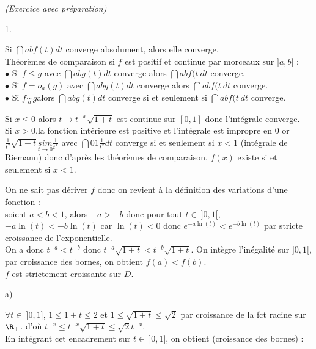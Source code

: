 \documentclass[11pt]{article}%
\begin{document}
 \begin{exercice}{\it (Exercice avec préparation)}~
 \begin{noliste}{1.}
 \setlength{\itemsep}{4mm}
 \item Si $\dint{a}{b} f(t)dt$ converge absolument, alors elle
converge.\\
 Théorèmes de comparaison si $f$ est positif et continue par morceaux
sur $]a,b]$ : \\
 $\bullet$ Si $f \leq g$ avec $\dint{a}{b} g(t)dt$ converge alors
$\dint{a}{b} f(t \ dt $ converge.\\
 $\bullet$ Si $f = o_{a}( g)$ avec $\dint{a}{b} g(t)dt$ converge alors
$\dint{a}{b} f(t \ dt $ converge.\\
 $\bullet$ Si $f \underset{a}{\sim} g$alors $\dint{a}{b} g(t)dt$
converge si et seulement si $\dint{a}{b} f(t \ dt $ converge.
 \item Si $x \leq 0$ alors $t \to t^{-x} \sqrt{1 + t}$ est continue sur
$[0,1]$ donc l'intégrale converge. \\
 Si $x>0$,la fonction intérieure est positive et l'intégrale est
impropre en 0 or $\frac{1}{t^{x}} \sqrt{1 + t} \underset{t \to 0}{sim}
\frac{1}{t^{x}}$ avec $\dint{0}{1} \frac{1}{t^{x}}dt$ converge si et
seulement si $x<1$ (intégrale de Riemann) donc d'après les théorèmes de
comparaison, $f(x)$ existe si et seulement si $x <1$.
 \item On ne sait pas dériver $f$ donc on revient à la définition des
variations d'une fonction : \\
 soient $a<b <1$, alors $-a > -b $ donc pour tout $t \in \ ]0,1[$, $-a
\ln(t) < -b \ln(t) $ car $\ln(t) < 0$ donc $e^{-a \ln(t) } < e^{-b
\ln(t) }$ par stricte croissance de l'exponentielle.\\
 On a donc $t^{-a} < t^{-b}$ donc $t^{-a} \sqrt{1 + t} < t^{-b} \sqrt{1
+ t}$. On intègre l'inégalité sur $]0,1[$, par croissance des bornes,
on obtient $f(a) < f(b)$.\\
 $f$ est strictement croissante sur $D$.
 \item\begin{noliste}{a)}
 \setlength{\itemsep}{2mm}
 \item $\forall t \in \ ]0,1]$, $1 \leq 1 + t \leq 2$ et $1 \leq
\sqrt{1 + t} \leq \sqrt{2}$ par croissance de la fct racine sur $\R_+
$. d'où $t^{-x} \leq t^{-x} \sqrt{1 + t} \leq \sqrt{2} t^{-x}$. \\
 En intégrant cet encadrement sur $t \in \ ]0,1]$, on obtient
(croissance des bornes) : 
 

\end{noliste}
\end{noliste}
\end{exercice}
\end{document}
